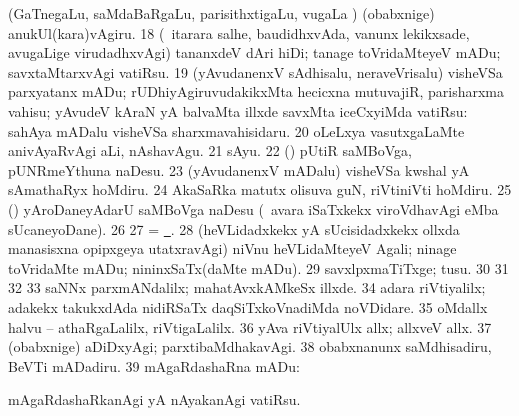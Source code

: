{  (GaTnegaLu, saMdaBaRgaLu, parisithxtigaLu, \mo vugaLa \vi)
(obabxnige) anukUl(kara)vAgiru. 
\num{18}  (\kanmu\ itarara salhe, baudidhxvAda,
\mo vanunx lekikxsade, avugaLige virudadhxvAgi) tananxdeV dAri hiDi;
tanage toVridaMteyeV mADu; savxtaMtarxvAgi vatiRsu. 
\num{19}  (yAvudanenxV sAdhisalu, neraveVrisalu) visheVSa
parxyatanx mADu; rUDhiyAgiruvudakikxMta hecicxna mutuvajiR,
parisharxma vahisu; yAvudeV kAraN yA balvaMta illxde savxMta iceCxyiMda
vatiRsu:  sahAya mADalu visheVSa
sharxmavahisidaru. 
\num{20}  oLeLxya vasutxgaLaMte
anivAyaRvAgi aLi, nAshavAgu. 
\num{21}  sAyu. 
\num{22}  (\AmA) pUtiR saMBoVga,
pUNRmeYthuna naDesu. 
\num{23}  (yAvudanenxV mADalu) visheVSa kwshal yA
sAmathaRyx hoMdiru. 
\num{24}  AkaSaRka matutx olisuva guN,
riVtiniVti hoMdiru. 
\num{25}  (\hA) yAroDaneyAdarU saMBoVga
naDesu (\kanmu\ avara iSaTxkekx viroVdhavAgi eMba sUcaneyoDane). 
\num{26}  
\num{27}  = 
\hyperlink{way pagu13}{\pagu\ }.  
\num{28}  (heVLidadxkekx yA sUcisidadxkekx
ollxda manasisxna opipxgeya utatxravAgi) niVnu heVLidaMteyeV Agali;
ninage toVridaMte mADu; nininxSaTx(daMte mADu). 
\num{29} 
savxlpxmaTiTxge; tusu. 
\num{30}  
\num{31}  
\num{32}  
\num{33}  saNNx parxmANdalilx; mahatAvxkAMkeSx
illxde. 
\num{34}  adara riVtiyalilx; adakekx takukxdAda
nidiRSaTx daqSiTxkoVnadiMda noVDidare. 
\num{35}  oMdallx halvu -- athaRgaLalilx,
riVtigaLalilx. 
\num{36}  yAva riVtiyalUlx allx; allxveV allx. 
\num{37}  (obabxnige) aDiDxyAgi;
parxtibaMdhakavAgi. 
\num{38}  obabxnanunx
saMdhisadiru, BeVTi mADadiru. 
\num{39}  mAgaRdashaRna mADu: 

  mAgaRdashaRkanAgi yA nAyakanAgi vatiRsu. 

}
